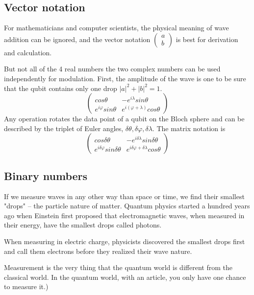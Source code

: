 \documentclass{book}
\begin{document}
\subsection{Vector notation}
For mathematicians and computer scientists, the physical meaning of wave addition can be ignored, and the vector notation $
\begin{pmatrix}
    a \\
    b
\end{pmatrix}$ is best for derivation and calculation.

But not all of the 4 real numbers the two complex numbers can be used independently for modulation. First, the amplitude of the wave is one to be sure that the qubit contains only one drop $|a|^2 + |b|^2 = 1$.
\begin{equation}
    \begin{pmatrix}
    cos\theta & -e^{i\lambda} sin\theta \\
    e^{i\varphi} sin\theta & e^{i(\varphi + \lambda)} cos\theta
\end{pmatrix}
\end{equation}
Any operation rotates the data point of a qubit on the Bloch sphere and can be described by the triplet of Euler angles, $\delta \theta, \delta \varphi, \delta \lambda$. The matrix notation is
\begin{equation}
    \begin{pmatrix}
        cos\delta \theta & -e^{i\delta \lambda} sin\delta \theta \\
        e^{i \delta \varphi} sin\delta \theta & e^{i \delta \varphi+ \delta \lambda} cos\theta 
    \end{pmatrix}
\end{equation}

\subsection{Binary numbers}

If we measure waves in any other way than space or time, we find their smallest "drops" -- the particle nature of matter. Quantum physics started a hundred years ago when Einstein first proposed that electromagnetic waves, when measured in their energy, have the smallest drops called photons.

When measuring in electric charge, physicists discovered the smallest drops first and call them electrons before they realized their wave nature.

Measurement is the very thing that the quantum world is different from the classical world. In the quantum world, with an article, you only have one chance to measure it.)
\end{document}
